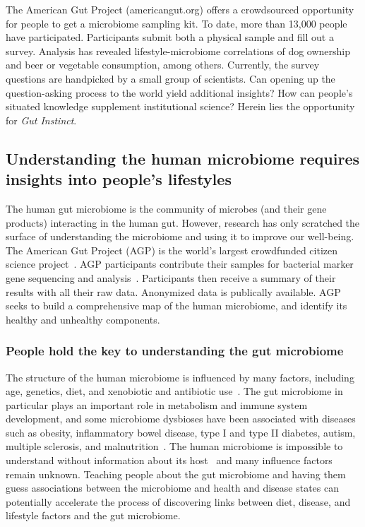 The American Gut Project (americangut.org) offers a
crowdsourced opportunity for people to get a microbiome
sampling kit. To date, more than 13,000 people have participated.
Participants submit both a physical sample and fill out
a survey. Analysis has revealed lifestyle-microbiome correlations
of dog ownership and beer or vegetable consumption,
among others. Currently, the survey questions are handpicked
by a small group of scientists. Can opening up the
question-asking process to the world yield additional insights?
How can people’s situated knowledge supplement institutional
science? Herein lies the opportunity for \textit{Gut Instinct}.


\subsection{Understanding the human microbiome requires insights into people’s lifestyles}
The human gut microbiome is the community of microbes (and their gene products) interacting in the human gut. However, research has only scratched the surface of understanding the microbiome and using it to improve our well-being. The American Gut Project (AGP) is the world's largest crowdfunded citizen science project~\cite{KnightLab2016a}. AGP participants contribute their samples for bacterial marker gene sequencing and analysis~\cite{Debelius2016}. Participants then receive a summary of their results with all their raw data. Anonymized data is publically available. AGP seeks to build a comprehensive map of the human microbiome, and identify its healthy and unhealthy components.

\subsubsection{People hold the key to understanding the gut microbiome}
The structure of the human microbiome is influenced by many factors, including age, genetics, diet, and xenobiotic and antibiotic use~\cite{Gill2006}. The gut microbiome in particular plays an important role in metabolism and immune system development, and some microbiome dysbioses have been associated with diseases such as obesity, inflammatory bowel disease, type I and type II diabetes, autism, multiple sclerosis, and malnutrition~\cite{Cho2012}. The human microbiome is impossible to understand without information about its host~\cite{Debelius2016} and many influence factors remain unknown. Teaching people about the gut microbiome and having them guess associations between the microbiome and health and disease states can potentially accelerate the process of discovering links between diet, disease, and lifestyle factors and the gut microbiome.


